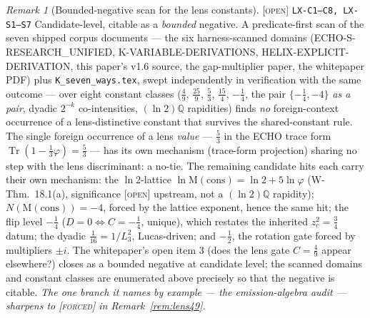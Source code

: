 \documentclass[11pt]{article}
\newcommand{\tagF}{\textcolor{cF}{\textsc{[forced]}}}
\newcommand{\tagO}{\textcolor{cO}{\textsc{[open]}}}
\newcommand{\hx}[1]{\textcolor{cC}{\footnotesize\texttt{#1}}}
\newcommand{\Q}{\mathbb{Q}}
\newcommand{\gp}{\varphi}
\newcommand{\M}{\mathrm{M}}
\theoremstyle{plain}
\theoremstyle{definition}
\theoremstyle{remark}
\newtheorem{remark}[theorem]{Remark}
\begin{document}
\begin{remark}[Bounded-negative scan for the lens constants]\label{rem:lensscan}\tagO{} \hx{LX-C1--C8, LX-S1--S7}
Candidate-level, citable as a \emph{bounded} negative. A predicate-first
scan of the seven shipped corpus documents --- the six harness-scanned
domains (ECHO-S-RESEARCH\_UNIFIED, K-VARIABLE-DERIVATIONS,
HELIX-EXPLICIT-DERIVATION, this paper's v1.6 source, the gap-multiplier
paper, the whitepaper PDF) plus \texttt{K\_seven\_ways.tex}, swept
independently in verification with the same outcome --- over eight constant
classes ($\tfrac49$, $\tfrac{25}9$, $\tfrac53$, $\tfrac{15}4$, $-\tfrac14$,
the pair $\{-\tfrac14,-4\}$ \emph{as a pair}, dyadic $2^{-k}$
co-intensities, $(\ln2)\Q$ rapidities) finds \emph{no} foreign-context
occurrence of a lens-distinctive constant that survives the
shared-constant rule. The single foreign occurrence of a lens \emph{value}
--- $\tfrac53$ in the ECHO trace form
$\operatorname{Tr}(1-\tfrac13\gp)=\tfrac53$ --- has its own mechanism
(trace-form projection) sharing no step with the lens discriminant: a
no-tie. The remaining candidate hits each carry their own mechanism: the
$\ln2$-lattice $\ln\M(\mathrm{cons})=\ln2+5\ln\gp$ (W-Thm.\ 18.1(a),
significance \tagO{} upstream, not a $(\ln2)\Q$ rapidity);
$N(\M(\mathrm{cons}))=-4$, forced by the lattice exponent, hence the same
hit; the flip level $-\tfrac14$ ($D=0\iff C=-\tfrac14$, unique), which
restates the inherited $z_c^2=\tfrac34$ datum; the dyadic
$\tfrac1{16}=1/L_3^2$, Lucas-driven; and $-\tfrac12$, the rotation gate
forced by multipliers $\pm i$. The whitepaper's open item 3 (does the lens
gate $C=\tfrac49$ appear elsewhere?) closes as a bounded negative at
candidate level; the scanned domains and constant classes are enumerated
above precisely so that the negative is citable. \emph{The one branch it names
by example --- the emission-algebra audit --- sharpens to \tagF{} in
Remark~\ref{rem:lens49}.}
\end{remark}
\end{document}
